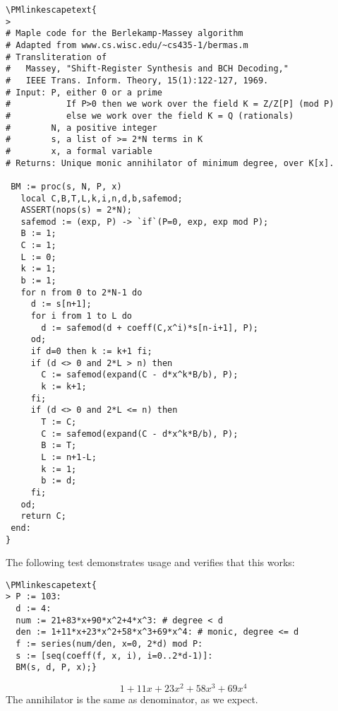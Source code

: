 \documentclass[12pt]{article}
\begin{document}
\begin{verbatim}
\PMlinkescapetext{
>
# Maple code for the Berlekamp-Massey algorithm
# Adapted from www.cs.wisc.edu/~cs435-1/bermas.m
# Transliteration of 
#   Massey, "Shift-Register Synthesis and BCH Decoding,"
#   IEEE Trans. Inform. Theory, 15(1):122-127, 1969.
# Input: P, either 0 or a prime
#           If P>0 then we work over the field K = Z/Z[P] (mod P)
#           else we work over the field K = Q (rationals)
#        N, a positive integer
#        s, a list of >= 2*N terms in K
#        x, a formal variable
# Returns: Unique monic annihilator of minimum degree, over K[x].

 BM := proc(s, N, P, x)
   local C,B,T,L,k,i,n,d,b,safemod;
   ASSERT(nops(s) = 2*N);
   safemod := (exp, P) -> `if`(P=0, exp, exp mod P);
   B := 1;
   C := 1;
   L := 0;
   k := 1;
   b := 1;
   for n from 0 to 2*N-1 do
     d := s[n+1];
     for i from 1 to L do
       d := safemod(d + coeff(C,x^i)*s[n-i+1], P);
     od;
     if d=0 then k := k+1 fi;
     if (d <> 0 and 2*L > n) then
       C := safemod(expand(C - d*x^k*B/b), P);
       k := k+1;
     fi;
     if (d <> 0 and 2*L <= n) then
       T := C;
       C := safemod(expand(C - d*x^k*B/b), P);
       B := T;
       L := n+1-L;
       k := 1;
       b := d;
     fi;
   od;
   return C;
 end:
}
\end{verbatim}

The following test demonstrates usage and verifies that this works:

\begin{verbatim}
\PMlinkescapetext{
> P := 103:
  d := 4:
  num := 21+83*x+90*x^2+4*x^3: # degree < d
  den := 1+11*x+23*x^2+58*x^3+69*x^4: # monic, degree <= d
  f := series(num/den, x=0, 2*d) mod P:
  s := [seq(coeff(f, x, i), i=0..2*d-1)]:
  BM(s, d, P, x);}
\end{verbatim}
$$1 + 11x + 23x^2 + 58x^3+69x^4$$
The annihilator is the same as denominator, as we expect.
\end{document}
